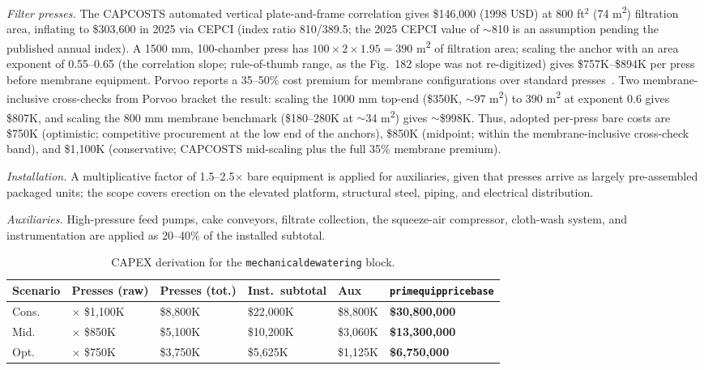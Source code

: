 \documentclass{article}
\renewcommand\_{\textunderscore\allowbreak}
\begin{document}
\textit{Filter presses.} The CAPCOSTS automated vertical plate-and-frame correlation gives \$146,000 (1998 USD) at 800 ft$^2$ (74 \si{m^2}) filtration area, inflating to \$303,600 in 2025 via CEPCI (index ratio 810/389.5; the 2025 CEPCI value of $\sim$810 is an assumption pending the published annual index). A 1500 mm, 100-chamber press has $100 \times 2 \times 1.95 = 390$ \si{m^2} of filtration area; scaling the anchor with an area exponent of 0.55--0.65 (the correlation slope; rule-of-thumb range, as the Fig.~182 slope was not re-digitized) gives \$757K--\$894K per press before membrane equipment. Porvoo reports a 35--50\% cost premium for membrane configurations over standard presses~\citep{porvooIndustrialFilterPress2025}. Two membrane-inclusive cross-checks from Porvoo bracket the result: scaling the 1000 mm top-end (\$350K, $\sim$97 \si{m^2}) to 390 \si{m^2} at exponent 0.6 gives \$807K, and scaling the 800 mm membrane benchmark (\$180--280K at $\sim$34 \si{m^2}) gives $\sim$\$998K. Thus, adopted per-press bare costs are \$750K (optimistic; competitive procurement at the low end of the anchors), \$850K (midpoint; within the membrane-inclusive cross-check band), and \$1,100K (conservative; CAPCOSTS mid-scaling plus the full 35\% membrane premium).

\textit{Installation.} A multiplicative factor of 1.5--2.5$\times$ bare equipment is applied for auxiliaries, given that presses arrive as largely pre-assembled packaged units; the scope covers erection on the elevated platform, structural steel, piping, and electrical distribution.

\textit{Auxiliaries.} High-pressure feed pumps, cake conveyors, filtrate collection, the squeeze-air compressor, cloth-wash system, and instrumentation are applied as 20--40\% of the installed subtotal.

\begin{table}[h!]
\caption{CAPEX derivation for the \texttt{mechanical\_dewatering} block.}
\centering
\begin{tabular}{>{\raggedright\arraybackslash}p{1.8cm}
				>{\raggedright\arraybackslash}p{2.3cm}
				>{\raggedright\arraybackslash}p{1.8cm}
				>{\raggedright\arraybackslash}p{1.8cm}
				>{\raggedright\arraybackslash}p{1.3cm}
				>{\raggedright\arraybackslash}p{2.7cm}}
\toprule
\textbf{Scenario} & \textbf{Presses (raw)} & \textbf{Presses (tot.)} & \textbf{Inst.\ subtotal} & \textbf{Aux} & \texttt{prim\_equip\_price\_base} \\
\midrule
Cons. & 8 $\times$ \$1,100K & \$8,800K & \$22,000K & \$8,800K &  \textbf{\$30,800,000} \\
Mid.  & 6 $\times$ \$850K & \$5,100K & \$10,200K & \$3,060K  & \textbf{\$13,300,000} \\
Opt.  & 5 $\times$ \$750K & \$3,750K & \$5,625K & \$1,125K  & \textbf{\$6,750,000} \\
\bottomrule
\end{tabular}
\end{table}
\end{document}
